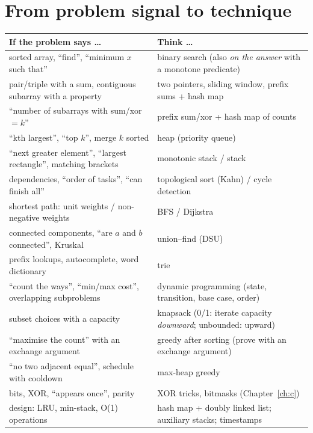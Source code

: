 \documentclass[10pt,a4paper,openany,oneside]{report}
\newcommand{\prio}[1]{\texorpdfstring{\ifcase#1\or{\color{gold}\ding{72}}\or{\color{gold}\ding{72}\ding{72}}\or{\color{gold}\ding{72}\ding{72}\ding{72}}\fi}{}}
\begin{document}
\section{From problem signal to technique \prio{3}}
\begin{center}\small
\begin{xltabular}{\textwidth}{@{}L{5.4cm}Y@{}}
\toprule
\textbf{If the problem says \ldots} & \textbf{Think \ldots}\\
\midrule\endhead
sorted array, ``find'', ``minimum $x$ such that'' & binary search (also \emph{on the answer} with a monotone predicate)\\
pair/triple with a sum, contiguous subarray with a property & two pointers, sliding window, prefix sums + hash map\\
``number of subarrays with sum/xor $=k$'' & prefix sum/xor + hash map of counts\\
``kth largest'', ``top $k$'', merge $k$ sorted & heap (priority queue)\\
``next greater element'', ``largest rectangle'', matching brackets & monotonic stack / stack\\
dependencies, ``order of tasks'', ``can finish all'' & topological sort (Kahn) / cycle detection\\
shortest path: unit weights / non-negative weights & BFS / Dijkstra\\
connected components, ``are $a$ and $b$ connected'', Kruskal & union--find (DSU)\\
prefix lookups, autocomplete, word dictionary & trie\\
``count the ways'', ``min/max cost'', overlapping subproblems & dynamic programming (state, transition, base case, order)\\
subset choices with a capacity & knapsack (0/1: iterate capacity \emph{downward}; unbounded: upward)\\
``maximise the count'' with an exchange argument & greedy after sorting (prove with an exchange argument)\\
``no two adjacent equal'', schedule with cooldown & max-heap greedy\\
bits, XOR, ``appears once'', parity & XOR tricks, bitmasks (Chapter~\ref{ch:c})\\
design: LRU, min-stack, O(1) operations & hash map + doubly linked list; auxiliary stacks; timestamps\\
\bottomrule
\end{xltabular}
\end{center}
\end{document}
